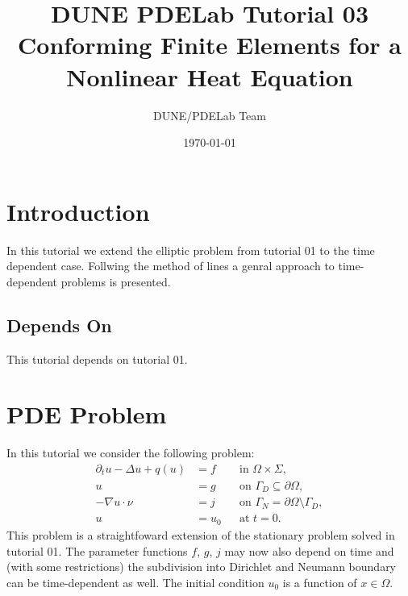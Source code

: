 \documentclass[a4paper,12pt]{article}
\title{DUNE PDELab Tutorial 03 \\ 
Conforming Finite Elements for a\\ Nonlinear Heat Equation}
\author{DUNE/PDELab Team}
\date{\today}
\begin{document}
\maketitle
\tableofcontents
\clearpage

\section{Introduction}

In this tutorial we extend the elliptic problem from tutorial 01 to the
time dependent case. Follwing the method of lines a genral approach to time-dependent
problems is presented.

\subsection*{Depends On} This tutorial depends on tutorial 01.

\section{PDE Problem}

In this tutorial we consider the following problem:
\begin{align*}
\partial_t u -\Delta u + q(u) &= f &&\text{in $\Omega\times\Sigma$},\\
u &= g &&\text{on $\Gamma_D\subseteq\partial\Omega$},\\
-\nabla u\cdot \nu &= j &&\text{on $\Gamma_N=\partial\Omega\setminus\Gamma_D$},\\
u &= u_0 &&\text{at $t=0$}.
\end{align*}
This problem is a straightfoward extension of the stationary
problem solved in tutorial 01.
The parameter functions $f$, $g$, $j$ may now also depend on time
and (with some restrictions) the subdivision into Dirichlet and Neumann boundary
can be time-dependent as well. The initial
condition $u_0$ is a function of $x\in\Omega$. 
\end{document}
